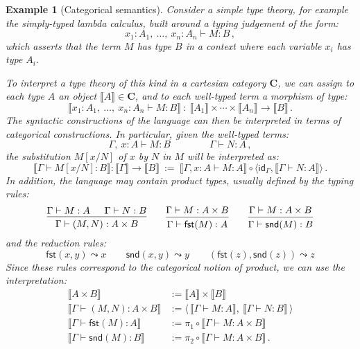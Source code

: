 \documentclass[11pt,oneside,draft]{book}
\newtheorem{example}[theorem]{Example}
\theoremstyle{definition}
\newcommand{\kw}[1]{\ensuremath{ \mathsf{#1} }}
\begin{document}
\begin{example}[Categorical semantics] \label{ex:ttcc} %
Consider a simple type theory,
for example the simply-typed lambda calculus,
built around a typing judgement of the form:
\[
  x_1 : A_1, \: \ldots, \: x_n : A_n \vdash M : B
  \,,
\]
which asserts that the term $M$ has type $B$
in a context where each variable $x_i$
has type $A_i$.

To interpret a type theory of this kind in
a cartesian category $\mathbf{C}$,
we can assign to each type $A$
an object $\llbracket A \rrbracket \in \mathbf{C}$,
and to each well-typed term a morphism of type:
\[
  \llbracket x_1 : A_1, \: \ldots, \: x_n : A_n \vdash M : B \rrbracket
  \: : \:
  \llbracket A_1 \rrbracket \times \cdots \times
  \llbracket A_n \rrbracket \rightarrow
  \llbracket B \rrbracket
  \,.
\]
The syntactic constructions of the language
can then be interpreted in terms of
categorical constructions.
In particular,
given the well-typed terms:
\[
  \Gamma, \: x : A \vdash M : B
  \qquad \qquad
  \Gamma \vdash N : A
  \,,
\]
the substitution $M[x/N]$ of $x$ by $N$ in $M$
will be interpreted as:
\[
  \llbracket \Gamma \vdash M[x/N] : B \rrbracket
  :
  \llbracket \Gamma \rrbracket \rightarrow \llbracket B \rrbracket
  \: := \:
  \llbracket \Gamma, x:A \vdash M : A \rrbracket \circ
  \langle
    \kw{id}_\Gamma,
    \llbracket \Gamma \vdash N : A \rrbracket
  \rangle
  \,.
\]
In addition,
the language may contain product types,
usually defined by the typing rules:
\[
  \begin{prooftree}
    \hypo{\Gamma \vdash M : A}
    \hypo{\Gamma \vdash N : B}
    \infer2{\Gamma \vdash (M, N) : A \times B}
  \end{prooftree}
  \qquad
  \begin{prooftree}
    \hypo{\Gamma \vdash M : A \times B}
    \infer1{\Gamma \vdash \kw{fst}(M) : A}
  \end{prooftree}
  \qquad
  \begin{prooftree}
    \hypo{\Gamma \vdash M : A \times B}
    \infer1{\Gamma \vdash \kw{snd}(M) : B}
  \end{prooftree}
\]
and the reduction rules:
\[
  \kw{fst}(x, y) \leadsto x
  \qquad
  \kw{snd}(x, y) \leadsto y
  \qquad
  (\kw{fst}(z), \kw{snd}(z)) \leadsto z
\]
Since these rules correspond to the categorical notion of product,
we can use the interpretation:
\begin{align*}
  \llbracket A \times B \rrbracket &:=
    \llbracket A \rrbracket \times \llbracket B \rrbracket \\
  \llbracket \Gamma \vdash (M, N) : A \times B \rrbracket &:=
    \langle \,
      \llbracket \Gamma \vdash M : A \rrbracket, \:
      \llbracket \Gamma \vdash N : B \rrbracket \,
    \rangle \\
  \llbracket \Gamma \vdash \kw{fst}(M) : A \rrbracket &:=
    \pi_1 \circ \llbracket \Gamma \vdash M : A \times B \rrbracket \\
  \llbracket \Gamma \vdash \kw{snd}(M) : B \rrbracket &:=
    \pi_2 \circ \llbracket \Gamma \vdash M : A \times B \rrbracket
  \,.
\end{align*}
\end{example}
\end{document}
